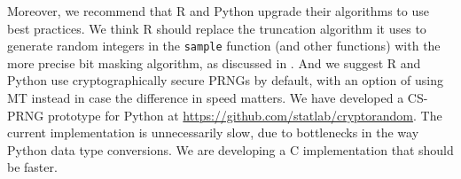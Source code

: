 \documentclass[graybox]{svmult}
\begin{document}
Moreover, we recommend that R and Python upgrade their algorithms to use best practices.
We think R should replace the truncation algorithm it uses to generate random integers in the \texttt{sample} function (and other functions) with the more precise bit masking algorithm, as discussed
in \cite{ottoboniStark18}.
And we suggest R and Python use cryptographically secure PRNGs by default, with an option of using MT instead in case the difference in speed matters.
We have developed a CS-PRNG prototype for Python at \url{https://github.com/statlab/cryptorandom}.
The current implementation is unnecessarily slow, due to bottlenecks in the way Python data type
conversions. 
We are developing a C implementation that should be faster.




%



\end{document}
